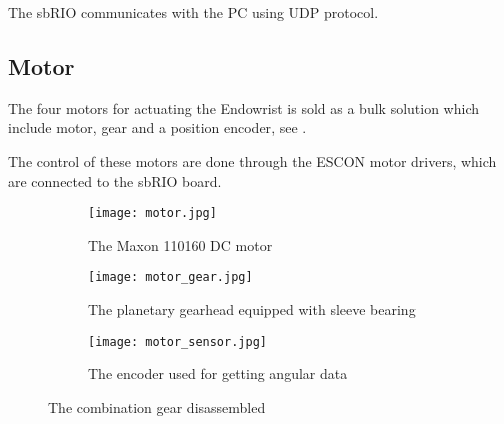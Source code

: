 The sbRIO communicates with the PC using UDP protocol. 




\subsection{Motor}\label{Maxon_Motor}
The four motors for actuating the Endowrist is sold as a bulk solution which include motor\cite{motor_motor}, gear\cite{motor_gear} and a position encoder\cite{motor_encoder}, see .

The control of these motors are done through the ESCON motor drivers, which are connected to the sbRIO board.


\begin{figure}[H]
	\centering
	\begin{subfigure}{.32\textwidth}
		\vspace{0pt}
		\centering
		\texttt{[image: motor.jpg]}
		\caption{The Maxon 110160 \newline DC motor}
		\label{fig:motor}
	\end{subfigure}
	\begin{subfigure}{.32\textwidth}
		\centering
		\texttt{[image: motor\_gear.jpg]}
		\caption{The planetary gearhead equipped with sleeve bearing}
		\label{fig:motor_gear}
	\end{subfigure}
	\begin{subfigure}{.32\textwidth}
		\centering
		\texttt{[image: motor\_sensor.jpg]}
		\caption{The encoder used for getting angular data}
		\label{fig:motor_sensor}
	\end{subfigure}
	\caption{The combination gear disassembled}
	\label{fig:Full_motor _dis}
\end{figure}

